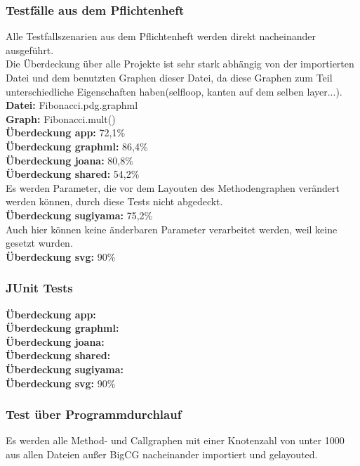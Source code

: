 \subsubsection{Testfälle aus dem Pflichtenheft}
Alle Testfallszenarien aus dem Pflichtenheft werden direkt nacheinander ausgeführt.\\
Die Überdeckung über alle Projekte ist sehr stark abhängig von der importierten Datei und dem benutzten Graphen dieser Datei, da diese Graphen zum Teil unterschiedliche Eigenschaften haben(selfloop, kanten auf dem selben layer...).\\

\textbf{Datei: }Fibonacci.pdg.graphml\\
\textbf{Graph: }Fibonacci.mult()\\
\textbf{Überdeckung app: }72,1\%\\
\textbf{Überdeckung graphml: }86,4\%\\
\textbf{Überdeckung joana: }80,8\%\\
\textbf{Überdeckung shared: }54,2\%\\
Es werden Parameter, die vor dem Layouten des Methodengraphen verändert werden können, durch diese Tests nicht abgedeckt.\\
\textbf{Überdeckung sugiyama: }75,2\%\\
Auch hier können keine änderbaren Parameter verarbeitet werden, weil keine gesetzt wurden.\\
\textbf{Überdeckung svg: }90\%\\
\subsubsection{JUnit Tests}

\textbf{Überdeckung app: }\\
\textbf{Überdeckung graphml: }\\
\textbf{Überdeckung joana: }\\
\textbf{Überdeckung shared: }\\
\textbf{Überdeckung sugiyama: }\\
\textbf{Überdeckung svg: }90\%\\

\subsubsection{Test über Programmdurchlauf}
Es werden alle Method- und Callgraphen mit einer Knotenzahl von unter 1000 aus allen Dateien außer BigCG nacheinander importiert und gelayouted.\\

